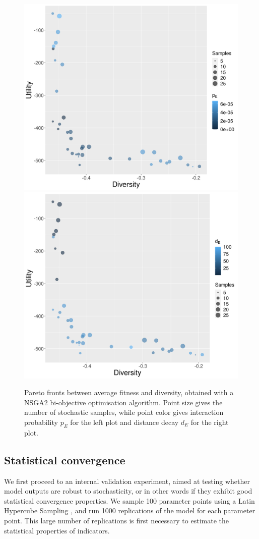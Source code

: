 \documentclass[letterpaper]{article}
\begin{document}
\begin{figure}[h!]
\begin{center}
\includegraphics[width=0.48\linewidth]{figures/paretoDiversity-Fitness_colorinteractionProba.png}
\includegraphics[width=0.48\linewidth]{figures/paretoDiversity-Fitness_colordistanceDecay.png}
\caption{Pareto fronts between average fitness and diversity, obtained with a NSGA2 bi-objective optimisation algorithm. Point size gives the number of stochastic samples, while point color gives interaction probability $p_E$ for the left plot and distance decay $d_E$ for the right plot.}
\label{fig:fig2}
\end{center}
\end{figure}


\subsection{Statistical convergence}

We first proceed to an internal validation experiment, aimed at testing whether model outputs are robust to stochasticity, or in other words if they exhibit good statistical convergence properties. We sample 100 parameter points using a Latin Hypercube Sampling \citep{giunta2003overview}, and run 1000 replications of the model for each parameter point. This large number of replications is first necessary to estimate the statistical properties of indicators.
\end{document}
